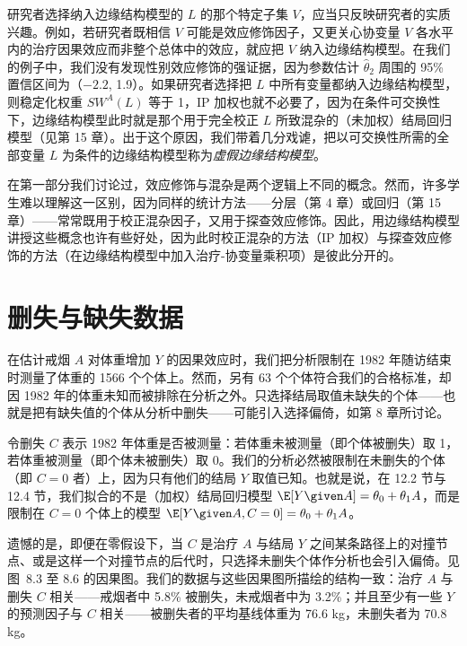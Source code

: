 研究者选择纳入边缘结构模型的 $L$ 的那个特定子集 $V$，应当只反映研究者的实质兴趣。例如，若研究者既相信 $V$ 可能是效应修饰因子，又更关心协变量 $V$ 各水平内的治疗因果效应而非整个总体中的效应，就应把 $V$ 纳入边缘结构模型。在我们的例子中，我们没有发现性别效应修饰的强证据，因为参数估计 $\hat\theta_2$ 周围的 95\% 置信区间为（$-2.2$, 1.9）。如果研究者选择把 $L$ 中所有变量都纳入边缘结构模型，则稳定化权重 $SW^{A}(L)$ 等于 1，IP 加权也就不必要了，因为在条件可交换性下，边缘结构模型此时就是那个用于完全校正 $L$ 所致混杂的（未加权）结局回归模型（见第 15 章）。出于这个原因，我们带着几分戏谑，把以可交换性所需的全部变量 $L$ 为条件的边缘结构模型称为\emph{虚假边缘结构模型}。

在第一部分我们讨论过，效应修饰与混杂是两个逻辑上不同的概念。然而，许多学生难以理解这一区别，因为同样的统计方法——分层（第 4 章）或回归（第 15 章）——常常既用于校正混杂因子，又用于探查效应修饰。因此，用边缘结构模型讲授这些概念也许有些好处，因为此时校正混杂的方法（IP 加权）与探查效应修饰的方法（在边缘结构模型中加入治疗-协变量乘积项）是彼此分开的。

\section{删失与缺失数据}

在估计戒烟 $A$ 对体重增加 $Y$ 的因果效应时，我们把分析限制在 1982 年随访结束时测量了体重的 1566 个个体上。然而，另有 63 个个体符合我们的合格标准，却因 1982 年的体重未知而被排除在分析之外。只选择结局取值未缺失的个体——也就是把有缺失值的个体从分析中删失——可能引入选择偏倚，如第 8 章所讨论。

令删失 $C$ 表示 1982 年体重是否被测量：若体重未被测量（即个体被删失）取 1，若体重被测量（即个体未被删失）取 0。我们的分析必然被限制在未删失的个体（即 $C=0$ 者）上，因为只有他们的结局 $Y$ 取值已知。也就是说，在 12.2 节与 12.4 节，我们拟合的不是（加权）结局回归模型 $\E[Y\given A]=\theta_0+\theta_1A$，而是限制在 $C=0$ 个体上的模型 $\E[Y\given A,C=0]=\theta_0+\theta_1A$。

遗憾的是，即便在零假设下，当 $C$ 是治疗 $A$ 与结局 $Y$ 之间某条路径上的对撞节点、或是这样一个对撞节点的后代时，只选择未删失个体作分析也会引入偏倚。见图~8.3 至 8.6 的因果图。我们的数据与这些因果图所描绘的结构一致：治疗 $A$ 与删失 $C$ 相关——戒烟者中 5.8\% 被删失，未戒烟者中为 3.2\%；并且至少有一些 $Y$ 的预测因子与 $C$ 相关——被删失者的平均基线体重为 76.6 kg，未删失者为 70.8 kg。

